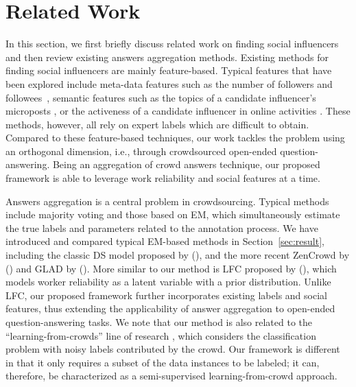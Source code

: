 \section{Related Work}

In this section, we first briefly discuss related work on finding social influencers and then review existing answers aggregation methods. Existing methods for finding social influencers are mainly feature-based. Typical features that have been explored include meta-data features such as the number of followers and followees~\cite{Lehmann2013,Cheng2014}, semantic features such as the topics of a candidate influencer's microposts \cite{riahi2012finding,wei2016learning}, or the activeness of a candidate influencer in online activities \cite{agarwal2008identifying,Lehmann2013}. These methods, however, all rely on expert labels which are difficult to obtain. Compared to these feature-based techniques, our work tackles the problem using an orthogonal dimension, i.e., through crowdsourced open-ended question-answering. Being an aggregation of crowd answers technique, our proposed framework is able to leverage work reliability and social features at a time.  


Answers aggregation is a central problem in crowdsourcing. Typical methods include majority voting \cite{sheng2008get} and those based on EM, which simultaneously estimate the true labels and parameters related to the annotation process. We have introduced and compared typical EM-based methods in Section~\ref{sec:result}, including the classic DS model proposed by \citeauthor{dawid1979maximum} (\citeyear{dawid1979maximum}), and the more recent ZenCrowd by \citeauthor{demartini2012zencrowd} (\citeyear{demartini2012zencrowd}) and GLAD by \citeauthor{whitehill2009whose} (\citeyear{whitehill2009whose}). More similar to our method is LFC proposed by \citeauthor{raykar2010learning} (\citeyear{raykar2010learning}), which models worker reliability as a latent variable with a prior distribution. Unlike LFC, our proposed framework further incorporates existing labels and social features, thus extending the applicability of answer aggregation to open-ended question-answering tasks. We note that our method is also related to the ``learning-from-crowds'' line of research \cite{raykar2010learning,tian2012learning,yang2018leveraging}, which considers the classification problem with noisy labels contributed by the crowd. Our framework is different in that it only requires a subset of the data instances to be labeled; it can, therefore, be characterized as a semi-supervised learning-from-crowd approach. 
